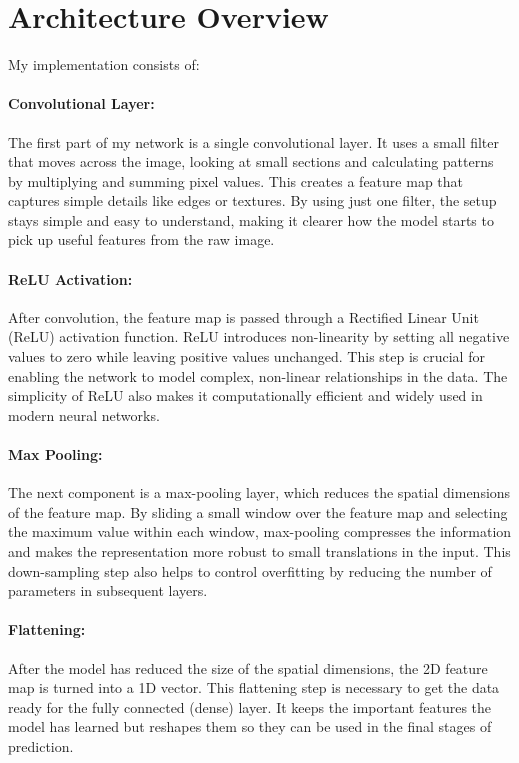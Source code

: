 \documentclass[conference]{IEEEtran}
\begin{document}
\section{Architecture Overview}
My implementation consists of:
\paragraph{Convolutional Layer:} The first part of my network is a single convolutional layer. It uses a small filter that moves across the image, looking at small sections and calculating patterns by multiplying and summing pixel values. This creates a feature map that captures simple details like edges or textures. By using just one filter, the setup stays simple and easy to understand, making it clearer how the model starts to pick up useful features from the raw image.

\paragraph{ReLU Activation:} After convolution, the feature map is passed through a Rectified Linear Unit (ReLU) activation function. ReLU introduces non-linearity by setting all negative values to zero while leaving positive values unchanged. This step is crucial for enabling the network to model complex, non-linear relationships in the data. The simplicity of ReLU also makes it computationally efficient and widely used in modern neural networks.

\paragraph{Max Pooling:} The next component is a max-pooling layer, which reduces the spatial dimensions of the feature map. By sliding a small window over the feature map and selecting the maximum value within each window, max-pooling compresses the information and makes the representation more robust to small translations in the input. This down-sampling step also helps to control overfitting by reducing the number of parameters in subsequent layers.

\paragraph{Flattening:} After the model has reduced the size of the spatial dimensions, the 2D feature map is turned into a 1D vector. This flattening step is necessary to get the data ready for the fully connected (dense) layer. It keeps the important features the model has learned but reshapes them so they can be used in the final stages of prediction.
\end{document}
